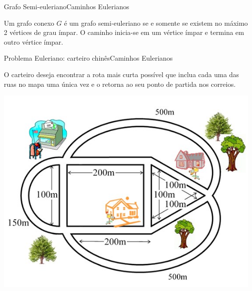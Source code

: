 \documentclass[t]{beamer}
\begin{document}

\begin{ftst}{Grafo Semi-euleriano}{Caminhos Eulerianos}

Um grafo conexo $G$ é um grafo semi-euleriano se e somente se existem no máximo 2 vértices de grau ímpar.
\vone
O caminho inicia-se em um vértice ímpar e termina em outro vértice ímpar.

\vone
\centering


\end{ftst}


\begin{ftst}{Problema Euleriano: carteiro chinês}{Caminhos Eulerianos}

O carteiro deseja encontrar a rota mais curta possível que inclua cada uma das ruas no mapa uma única vez e o retorna ao seu ponto de partida nos correios.

\vone
\centering
\includegraphics[scale=0.5]{Figuras/carteiro.jpg}

\end{ftst}

\end{document}
